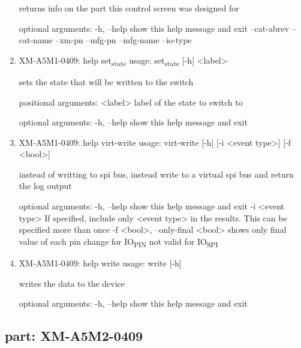 \documentclass[11pt]{article}
\begin{document}
\begin{enumerate}
returns info on the part this control screen was designed for

optional arguments:
  -h, --help   show this help message and exit
  --cat-abrev
  --cat-name
  --xm-pn
  --mfg-pn
  --mfg-name
  --io-type

\item XM-A5M1-0409: help set\textsubscript{state}
\label{sec:org55da3af}
usage: set\textsubscript{state} [-h] <label>

sets the state that will be written to the switch

positional arguments:
  <label>     label of the state to switch to

optional arguments:
  -h, --help  show this help message and exit

\item XM-A5M1-0409: help virt-write
\label{sec:org9ede2df}
usage: virt-write [-h] [-i <event type>] [-f <bool>]

instead of writting to spi bus, instead write to a virtual spi bus and return
the log output

optional arguments:
  -h, --help            show this help message and exit
  -i <event type>       If specified, include only <event type> in the
                        results. This can be specified more than once
  -f <bool>, --only-final <bool>
                        shows only final value of each pin change for IO\textsubscript{PIN}
                        not valid for IO\textsubscript{SPI}

\item XM-A5M1-0409: help write
\label{sec:orgbc98591}
usage: write [-h]

writes the data to the device

optional arguments:
  -h, --help  show this help message and exit
\end{enumerate}

\subsection{part: XM-A5M2-0409}
\label{sec:org613361a}
\end{document}
